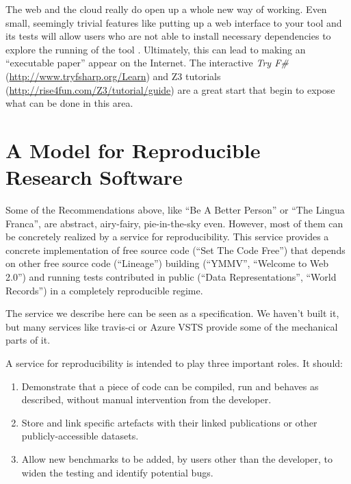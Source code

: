 \documentclass[a4paper,11pt]{article}
\begin{document}
 The web and the
cloud really do open up a whole new way of working. Even small,
seemingly trivial features like putting up a web interface to your
tool and its tests will allow users who are not able to install
necessary dependencies to explore the running of the tool
\cite{Hall2014}. Ultimately, this can lead to making an ``executable
paper'' appear on the Internet. The interactive {\em Try
F\#}(\url{http://www.tryfsharp.org/Learn}) and Z3
tutorials (\url{http://rise4fun.com/Z3/tutorial/guide}) are a
great start that begin to expose what can be done in this area.


\section{A Model for Reproducible Research Software}\label{sec:conclusion} 

Some of the Recommendations above, like ``Be A Better Person'' or
``The Lingua Franca'', are abstract, airy-fairy, pie-in-the-sky
even. However, most of them can be concretely realized by a service
for reproducibility. This service provides a concrete implementation
of free source code (``Set The Code Free'') that depends on other free
source code (``Lineage'') building (``YMMV'', ``Welcome to Web 2.0'')
and running tests contributed in public (``Data Representations'',
``World Records'') in a completely reproducible regime.

The service we describe here can be seen as a specification. We
haven't built it, but many services like travis-ci or Azure VSTS
provide some of the mechanical parts of it. 

A service for reproducibility is intended to play three important
roles. It should:

\begin{enumerate}
\item Demonstrate that a piece of code can be compiled, run
and behaves as described, without manual intervention from the
developer.
\item Store and link specific artefacts with their linked
publications or other publicly-accessible datasets.
\item Allow new benchmarks to be added, by users other than
the developer, to widen the testing and identify potential bugs.
\end{enumerate}
\end{document}

